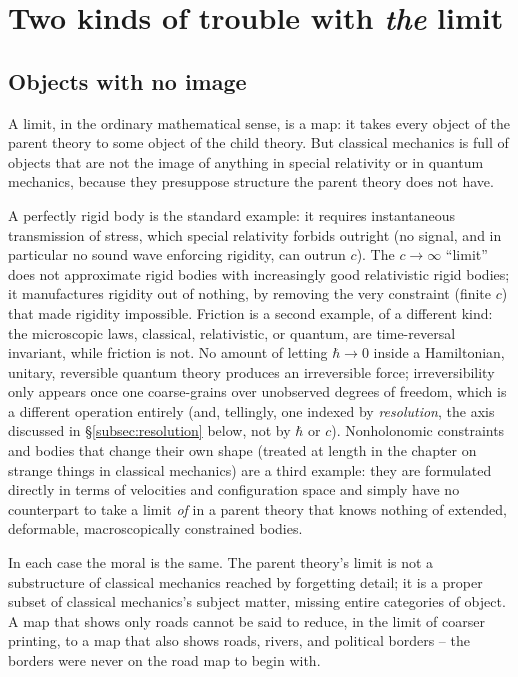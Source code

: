 \section{Two kinds of trouble with \emph{the} limit}
\label{sec:trouble}

\subsection{Objects with no image}
\label{subsec:missing}

A limit, in the ordinary mathematical sense, is a map: it takes every object of the parent theory to some object of the child theory. But classical mechanics is full of objects that are not the image of anything in special relativity or in quantum mechanics, because they presuppose structure the parent theory does not have.

A perfectly rigid body is the standard example: it requires instantaneous transmission of stress, which special relativity forbids outright (no signal, and in particular no sound wave enforcing rigidity, can outrun $c$). The $c\to\infty$ ``limit'' does not approximate rigid bodies with increasingly good relativistic rigid bodies; it manufactures rigidity out of nothing, by removing the very constraint (finite $c$) that made rigidity impossible. Friction is a second example, of a different kind: the microscopic laws, classical, relativistic, or quantum, are time-reversal invariant, while friction is not. No amount of letting $\hbar\to 0$ inside a Hamiltonian, unitary, reversible quantum theory produces an irreversible force; irreversibility only appears once one coarse-grains over unobserved degrees of freedom, which is a different operation entirely (and, tellingly, one indexed by \emph{resolution}, the axis discussed in \S\ref{subsec:resolution} below, not by $\hbar$ or $c$). Nonholonomic constraints and bodies that change their own shape (treated at length in the chapter on strange things in classical mechanics) are a third example: they are formulated directly in terms of velocities and configuration space and simply have no counterpart to take a limit \emph{of} in a parent theory that knows nothing of extended, deformable, macroscopically constrained bodies.

In each case the moral is the same. The parent theory's limit is not a substructure of classical mechanics reached by forgetting detail; it is a proper subset of classical mechanics's subject matter, missing entire categories of object. A map that shows only roads cannot be said to reduce, in the limit of coarser printing, to a map that also shows roads, rivers, and political borders -- the borders were never on the road map to begin with.

